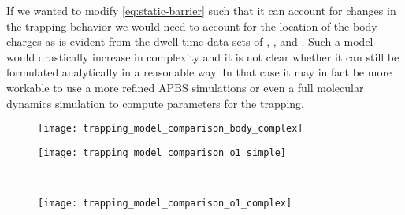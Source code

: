 If we wanted to modify \cref{eq:static-barrier} such that it can account for changes in the trapping behavior
we would need to account for the location of the body charges as is evident from the dwell time data sets of
, , and . Such a model would drastically increase in complexity and it is
not clear whether it can still be formulated analytically in a reasonable way. In that case it may in fact be
more workable to use a more refined APBS simulations or even a full molecular dynamics simulation to compute
parameters for the trapping.

%
\begin{figure*}[p]
  \centering
  \begin{subfigure}[t]{5.5cm}
		\centering
		\caption{}\vspace{-3mm}\label{fig:trapping_model_comparison_body_complex}
    \texttt{[image: trapping\_model\_comparison\_body\_complex]}
  \end{subfigure}
  \begin{minipage}[t]{6cm}
    \begin{subfigure}[t]{5.5cm}
      \centering
      \caption{}\vspace{-3mm}\label{fig:trapping_model_comparison_o1_simple}
      \texttt{[image: trapping\_model\_comparison\_o1\_simple]}
    \end{subfigure}
    \\
    \begin{subfigure}[t]{5.5cm}
      \centering
      \caption{}\vspace{-3mm}\label{fig:trapping_model_comparison_o1_complex}
      \texttt{[image: trapping\_model\_comparison\_o1\_complex]}
    \end{subfigure}
  \end{minipage}


\end{figure*}
